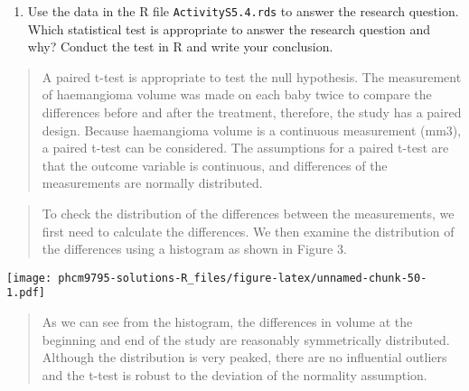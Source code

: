 \documentclass[
]{memoir}
\newenvironment{Shaded}{\begin{snugshade}}{\end{snugshade}}
\newcommand{\AttributeTok}[1]{\textcolor[rgb]{0.77,0.63,0.00}{#1}}
\newcommand{\FunctionTok}[1]{\textcolor[rgb]{0.00,0.00,0.00}{#1}}
\newcommand{\NormalTok}[1]{#1}
\newcommand{\OtherTok}[1]{\textcolor[rgb]{0.56,0.35,0.01}{#1}}
\newcommand{\SpecialCharTok}[1]{\textcolor[rgb]{0.00,0.00,0.00}{#1}}
\newcommand{\StringTok}[1]{\textcolor[rgb]{0.31,0.60,0.02}{#1}}
\providecommand{\tightlist}{%
  \setlength{\itemsep}{0pt}\setlength{\parskip}{0pt}}
\begin{document}
\begin{enumerate}
\def\labelenumi{\alph{enumi})}
\setcounter{enumi}{1}
\tightlist
\item
  Use the data in the R file \texttt{ActivityS5.4.rds} to answer the research question. Which statistical test is appropriate to answer the research question and why? Conduct the test in R and write your conclusion.
\end{enumerate}

\begin{quote}
A paired t-test is appropriate to test the null hypothesis. The measurement of haemangioma volume was made on each baby twice to compare the differences before and after the treatment, therefore, the study has a paired design. Because haemangioma volume is a continuous measurement (mm3), a paired t-test can be considered. The assumptions for a paired t-test are that the outcome variable is continuous, and differences of the measurements are normally distributed.
\end{quote}

\begin{quote}
To check the distribution of the differences between the measurements, we first need to calculate the differences. We then examine the distribution of the differences using a histogram as shown in Figure 3.
\end{quote}

\begin{Shaded}
\end{Shaded}

\texttt{[image: phcm9795-solutions-R\_files/figure-latex/unnamed-chunk-50-1.pdf]}

\begin{quote}
As we can see from the histogram, the differences in volume at the beginning and end of the study are reasonably symmetrically distributed. Although the distribution is very peaked, there are no influential outliers and the t-test is robust to the deviation of the normality assumption.
\end{quote}
\end{document}
